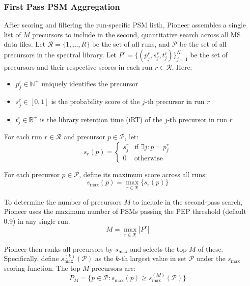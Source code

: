 \documentclass[pdflatex,sn-nature]{sn-jnl}
\begin{document}
\subsubsection{First Pass PSM Aggregation}\label{subsubsec:first-pass-psm-aggregation}
After scoring and filtering the run-specific PSM listh, Pioneer assembles a single list of $M$ precursors to include in the second, quantitative search across all MS data files. Let $\mathcal{R} = \{1, \ldots, R\}$ be the set of all runs, and $\mathcal{P}$ be the set of all precursors in the spectral library. Let $P^{r} = \{(p_j^{r}, s_j^{r}, t_j^{r})\}_{j=1}^{N_r}$ be the set of precursors and their respective scores in each run $r \in \mathcal{R}$. Here:
\begin{itemize}
\item $p_j^{r} \in \mathbb{N}^+$ uniquely identifies the precursor
\item $s_j^{r} \in [0,1]$ is the probability score of the $j$-th precursor in run $r$
\item $t_j^{r} \in \mathbb{R}^+$ is the library retention time (iRT) of the $j$-th precursor in run $r$
\end{itemize}

For each run $r \in \mathcal{R}$ and precursor $p \in \mathcal{P}$, let:
\begin{equation}
    s_r(p) = \begin{cases}
        s_j^{r} & \text{if } \exists j : p = p_j^{r} \\
        0 & \text{otherwise}
    \end{cases}
\end{equation}

For each precursor $p \in \mathcal{P}$, define its maximum score across all runs:
\begin{equation}
    s_{\text{max}}(p) = \max_{r \in \mathcal{R}} \{s_r(p)\}
\end{equation}

To determine the number of precursors $M$ to include in the second-pass search, Pioneer uses the maximum number of PSMs passing the PEP threshold (default 0.9) in any single run.
\begin{equation}
    M = \max_{r \in \mathcal{R}} |P^r|
\end{equation}

Pioneer then ranks all precursors by $s_{\text{max}}$ and selects the top $M$ of these. Specifically, define $s_{\text{max}}^{(k)}(\mathcal{P})$ as the $k$-th largest value in set $\mathcal{P}$ under the $s_{\text{max}}$ scoring function. The top $M$ precursors are:
\begin{equation}
    P_M = \{p \in \mathcal{P} : s_{\text{max}}(p) \geq s_{\text{max}}^{(M)}(\mathcal{P})\}
\end{equation}
\end{document}
